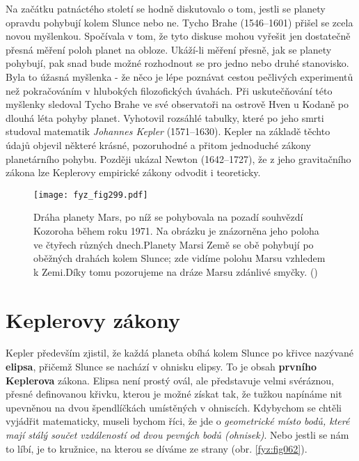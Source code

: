     Na začátku patnáctého století se hodně diskutovalo o tom, jestli se planety opravdu pohybují 
    kolem Slunce nebo ne. Tycho Brahe (1546–1601) přišel se zcela novou myšlenkou. Spočívala v tom, 
    že tyto diskuse mohou vyřešit jen dostatečně přesná měření poloh planet na obloze. Ukáží-li 
    měření přesně, jak se planety pohybují, pak snad bude možné rozhodnout se pro jedno nebo druhé 
    stanovisko. Byla to úžasná myšlenka - že něco je lépe poznávat cestou pečlivých experimentů než 
    pokračováním v hlubokých filozofických úvahách. Při uskutečňování této myšlenky sledoval Tycho 
    Brahe ve své observatoři na ostrově Hven u Kodaně po dlouhá léta pohyby planet. Vyhotovil 
    rozsáhlé tabulky, které po jeho smrti studoval matematik \emph{Johannes Kepler} (1571–1630). 
    Kepler na základě těchto údajů objevil některé krásné, pozoruhodné a přitom jednoduché zákony 
    planetárního pohybu. Později ukázal Newton (1642–1727), že z jeho gravitačního zákona lze 
    Keplerovy empirické zákony odvodit i teoreticky.

    \begin{figure}[ht!]  %
      \centering
      \texttt{[image: fyz\_fig299.pdf]}
      \caption{Dráha planety Mars, po níž se pohybovala na pozadí souhvězdí Kozoroha během roku 
               1971. Na obrázku je znázorněna jeho poloha ve čtyřech různých dnech.Planety Marsi 
               Země se obě pohybují po oběžných drahách kolem Slunce; zde vidíme polohu Marsu 
               vzhledem k Zemi.Díky tomu pozorujeme na dráze Marsu zdánlivé smyčky. 
               (\cite[s.~366]{Halliday2001})}
      \label{fyz:fig299}
    \end{figure}
    
  \section{Keplerovy zákony}
    Kepler především zjistil, že každá planeta obíhá kolem Slunce po křivce nazývané 
    \textbf{elipsa}, přičemž Slunce se nachází v ohnisku elipsy. To je obsah \textbf{prvního 
    Keplerova} zákona. Elipsa není prostý ovál, ale představuje velmi svéráznou, přesné definovanou 
    křivku, kterou je možné získat tak, že tužkou napínáme nit upevněnou na dvou špendlíčkách 
    umístěných v ohniscích. Kdybychom se chtěli vyjádřit matematicky, museli bychom říci, že jde o 
    \emph{geometrické místo bodů, které mají stálý součet vzdáleností od dvou pevných bodů 
    (ohnisek)}. Nebo jestli se nám to líbí, je to kružnice, na kterou se díváme ze strany (obr. 
    \ref{fyz:fig062}).
    
